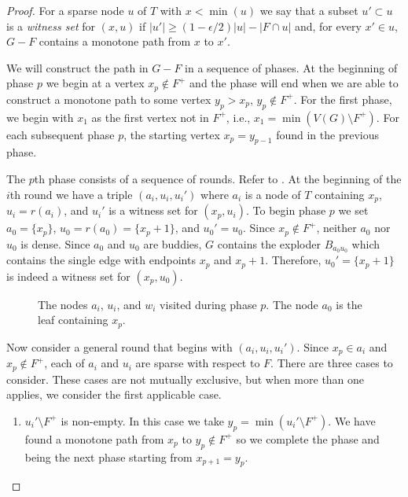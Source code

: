 \documentclass{patmorin}
\begin{document}
\begin{proof}
  For a sparse node $u$ of $T$ with $x<\min(u)$ we say that a subset
  $u'\subset u$ is a \emph{witness set} for $(x,u)$ if $|u'|\ge
  (1-\epsilon/2)|u|-|F\cap u|$ and, for every $x'\in u$, $G-F$ contains
  a monotone path from $x$ to $x'$.

  We will construct the path in $G-F$ in a sequence of phases. At
  the beginning of phase $p$ we begin at a vertex $x_p\not\in F^+$
  and the phase will end when we are able to construct a monotone path to some
  vertex $y_p>x_p$, $y_p\not\in F^+$.  For the first phase, we begin with $x_1$
  as the first vertex not in $F^+$, i.e., $x_1=\min(V(G)\setminus F^+)$.
  For each subsequent phase $p$, the starting vertex $x_p=y_{p-1}$ found
  in the previous phase.

  The $p$th phase consists of a sequence of rounds. Refer to
  .   At the beginning of the $i$th round we have a
  triple $(a_i,u_i,u_i')$ where $a_i$ is a node of $T$ containing $x_p$,
  $u_i=r(a_i)$, and $u_i'$ is a witness set for $(x_p,u_i)$.  To begin
  phase $p$ we set $a_0=\{x_p\}$, $u_0=r(a_0)=\{x_p+1\}$, and $u_0'=u_0$.
  Since $x_p\not\in F^+$, neither $a_0$ nor $u_0$ is dense.  Since $a_0$
  and $u_0$ are buddies, $G$ contains the exploder $B_{a_0u_0}$ which
  contains the single edge with endpoints $x_p$ and $x_p+1$.  Therefore,
  $u_0'=\{x_p+1\}$ is indeed a witness set for $(x_p,u_0)$.

  \begin{figure}
    \caption{The nodes $a_i$, $u_i$, and $w_i$ visited during
      phase $p$. The node $a_0$ is the leaf containing $x_p$.}
  \end{figure}

  Now consider a general round that begins with $(a_i,u_i,u_i')$.
  Since $x_p\in a_i$ and $x_p\not\in F^+$, each of $a_i$ and $u_i$ are
  sparse with respect to $F$. There are three cases to consider. These
  cases are not mutually exclusive, but when more than one applies,
  we consider the first applicable case.
  \begin{enumerate}
   \item $u_i'\setminus F^+$ is non-empty. In this case we take
    $y_p=\min(u_i'\setminus F^+)$. We have found a monotone
    path from $x_p$ to $y_p\not\in F^+$ so we complete the phase and
    being the next phase starting from $x_{p+1}=y_p$.


\end{enumerate}
\end{proof}
\end{document}

